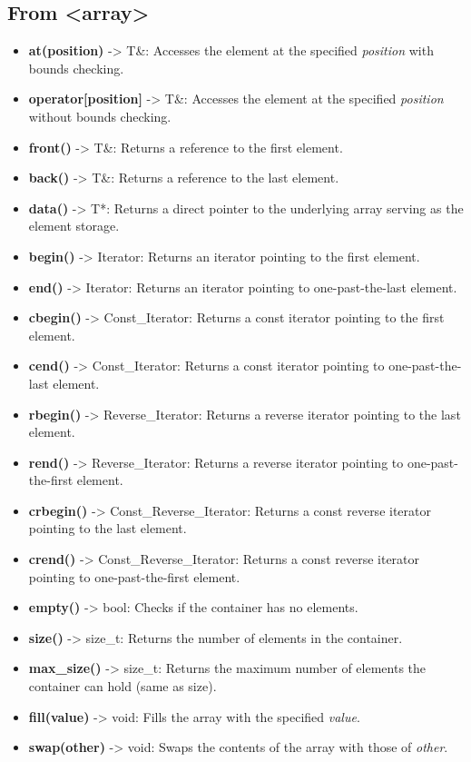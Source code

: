 \documentclass{report}
\begin{document}
    \pagebreak \bigbreak \noindent 
    \subsection{From <array>}
    \begin{itemize}
        \item \textbf{at(position)} -> T\&: Accesses the element at the specified \textit{position} with bounds checking.
        \item \textbf{operator[position]} -> T\&: Accesses the element at the specified \textit{position} without bounds checking.
        \item \textbf{front()} -> T\&: Returns a reference to the first element.
        \item \textbf{back()} -> T\&: Returns a reference to the last element.
        \item \textbf{data()} -> T*: Returns a direct pointer to the underlying array serving as the element storage.
        \item \textbf{begin()} -> Iterator: Returns an iterator pointing to the first element.
        \item \textbf{end()} -> Iterator: Returns an iterator pointing to one-past-the-last element.
        \item \textbf{cbegin()} -> Const\_Iterator: Returns a const iterator pointing to the first element.
        \item \textbf{cend()} -> Const\_Iterator: Returns a const iterator pointing to one-past-the-last element.
        \item \textbf{rbegin()} -> Reverse\_Iterator: Returns a reverse iterator pointing to the last element.
        \item \textbf{rend()} -> Reverse\_Iterator: Returns a reverse iterator pointing to one-past-the-first element.
        \item \textbf{crbegin()} -> Const\_Reverse\_Iterator: Returns a const reverse iterator pointing to the last element.
        \item \textbf{crend()} -> Const\_Reverse\_Iterator: Returns a const reverse iterator pointing to one-past-the-first element.
        \item \textbf{empty()} -> bool: Checks if the container has no elements.
        \item \textbf{size()} -> size\_t: Returns the number of elements in the container.
        \item \textbf{max\_size()} -> size\_t: Returns the maximum number of elements the container can hold (same as size).
        \item \textbf{fill(value)} -> void: Fills the array with the specified \textit{value}.
        \item \textbf{swap(other)} -> void: Swaps the contents of the array with those of \textit{other}.
    \end{itemize}

    





    
\end{document}
